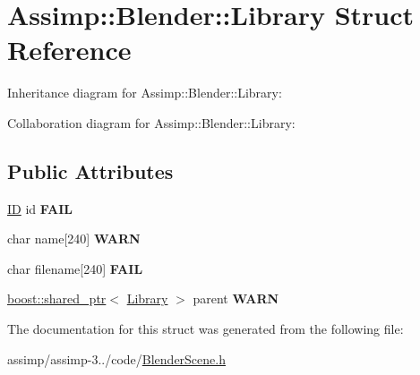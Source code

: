 \hypertarget{struct_assimp_1_1_blender_1_1_library}{\section{Assimp\+:\+:Blender\+:\+:Library Struct Reference}
\label{struct_assimp_1_1_blender_1_1_library}
}


Inheritance diagram for Assimp\+:\+:Blender\+:\+:Library\+:


Collaboration diagram for Assimp\+:\+:Blender\+:\+:Library\+:
\subsection*{Public Attributes}
\begin{DoxyCompactItemize}
\item 
\hypertarget{struct_assimp_1_1_blender_1_1_library_afc7d5c0cd8ac6b90b158caf63491a5f2}{\hyperlink{struct_assimp_1_1_blender_1_1_i_d}{I\+D} id {\bfseries F\+A\+I\+L}}\label{struct_assimp_1_1_blender_1_1_library_afc7d5c0cd8ac6b90b158caf63491a5f2}

\item 
\hypertarget{struct_assimp_1_1_blender_1_1_library_ad4ac383c2778ce2cd82da6fe7a00592e}{char name\mbox{[}240\mbox{]} {\bfseries W\+A\+R\+N}}\label{struct_assimp_1_1_blender_1_1_library_ad4ac383c2778ce2cd82da6fe7a00592e}

\item 
\hypertarget{struct_assimp_1_1_blender_1_1_library_a47d2fd70902a53e349be34cc6eae0bf8}{char filename\mbox{[}240\mbox{]} {\bfseries F\+A\+I\+L}}\label{struct_assimp_1_1_blender_1_1_library_a47d2fd70902a53e349be34cc6eae0bf8}

\item 
\hypertarget{struct_assimp_1_1_blender_1_1_library_a0aac61b3599d21b1cd75ce367d41dd13}{\hyperlink{classboost_1_1shared__ptr}{boost\+::shared\+\_\+ptr}$<$ \hyperlink{struct_assimp_1_1_blender_1_1_library}{Library} $>$ parent {\bfseries W\+A\+R\+N}}\label{struct_assimp_1_1_blender_1_1_library_a0aac61b3599d21b1cd75ce367d41dd13}

\end{DoxyCompactItemize}


The documentation for this struct was generated from the following file\+:\begin{DoxyCompactItemize}
\item 
assimp/assimp-\/3../code/\hyperlink{_blender_scene_8h}{Blender\+Scene.\+h}\end{DoxyCompactItemize}
